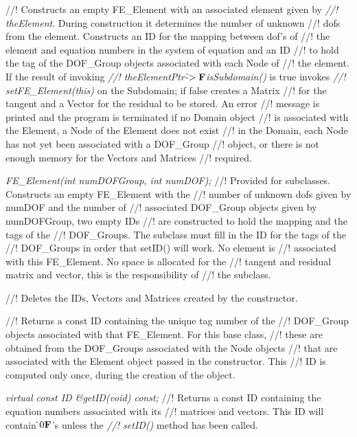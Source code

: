 //! Constructs an empty FE\_Element with an associated element given by {\em
//! theElement}.  During construction it determines the number of unknown
//! dofs from the element. Constructs an ID for the mapping between dof's of
//! the element and equation numbers in the system of equation and an ID
//! to hold the tag of the DOF\_Group objects associated with each Node of
//! the element. If the result of invoking {\em
//! theElementPtr-\f$>{\bf F}$isSubdomain()} is \p true invokes {\em
//! setFE\_Element(this)} on the Subdomain; if false creates a Matrix 
//! for the tangent and a Vector for the residual to be stored. An error
//! message is printed and the program is terminated if no Domain object
//! is associated with the Element, a Node of the Element does not exist
//! in the Domain, each Node has not yet been associated with a DOF\_Group
//! object, or there is not enough memory for the Vectors and Matrices
//! required.  

{\em FE\_Element(int numDOFGroup, int numDOF);}
//! Provided for subclasses. Constructs an empty FE\_Element with the
//! number of unknown dofs given by \p numDOF and the number of
//! associated DOF\_Group objects given by \p numDOFGroup, two empty IDs
//! are constructed to hold the mapping and the tags of the
//! DOF\_Groups. The subclass must fill in the ID for the tags of the
//! DOF\_Groups in order that setID() will work. No element is
//! associated with this FE\_Element. No space is allocated for the
//! tangent and residual matrix and vector, this is the responsibility of
//! the subclass.  

//! Deletes the IDs, Vectors and Matrices created by the constructor.

//! Returns a const ID containing the unique tag number of the
//! DOF\_Group objects associated with that FE\_Element. For this base class,
//! these are obtained from the DOF\_Groups associated with the Node objects
//! that are associated with the Element object passed in the constructor. This
//! ID is computed only once, during the creation of the object.

{\em virtual const ID \&getID(void) const;}
//! Returns a const ID containing the equation numbers associated with its
//! matrices and vectors. This ID will contain \f$0{\bf F}$'s unless the {\em
//! setID()} method has been called.

